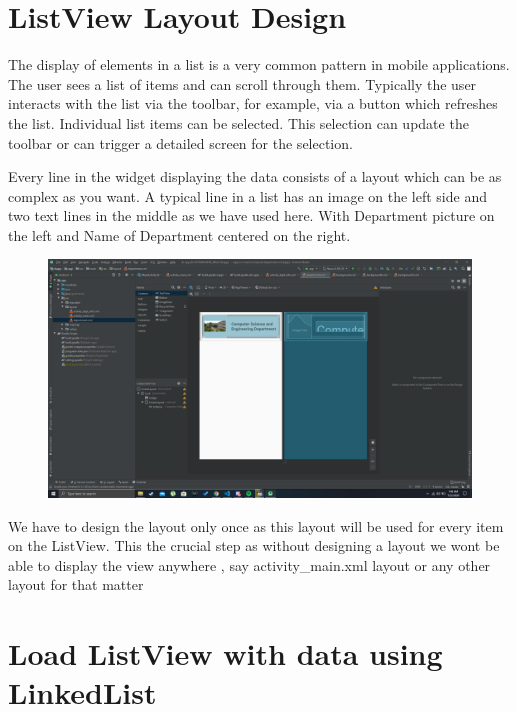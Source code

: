 \documentclass[11pt,a4paper]{report}
\begin{document}
\chapter{ListView Layout Design}

The display of elements in a list is a very common pattern in mobile applications. The user sees a list of items and can scroll through them. 
Typically the user interacts with the list via the toolbar, for example, via a button which refreshes the list. Individual list items can be selected. This selection can update the toolbar or can trigger a detailed screen for the selection. 


Every line in the widget displaying the data consists of a layout which can be as complex as you want. A typical line in a list has an image on the left side and two text lines in the middle as we have used here.
With Department picture on the left and Name of Department centered on the right.

\vspace{15pt}

\begin{figure}[H]
	\centering
		\includegraphics[scale=0.2]{./img/listview_2.png}
  \end{figure}

  \vspace{5pt}

We have to design the layout only once as this layout will be used for every item on the ListView.
This the crucial step as without designing a layout we wont be able to display the view 
anywhere , say activity\_main.xml layout or any other layout for that matter




\chapter{Load ListView with data using LinkedList}
\end{document}
